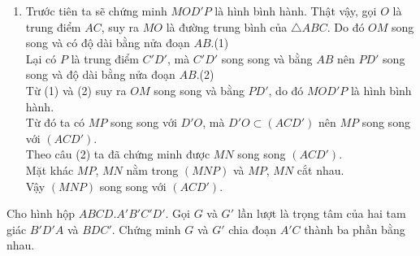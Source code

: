 \begin{bt}
\begin{bt}[CD, mức độ 3]
{\begin{enumerate}
			\item Trước tiên ta sẽ chứng minh $MOD'P$ là hình bình hành.
			Thật vậy, gọi $O$ là trung điểm $AC$, suy ra $MO$ là đường trung bình của $\triangle ABC$. Do đó $OM$ song song và có độ dài bằng nửa đoạn $AB$.\hfill (1)\\
			Lại có $P$ là trung điểm $C'D'$, mà $C'D'$ song song và bằng $AB$ nên $PD'$ song song và độ dài bằng nửa đoạn $AB$.\hfill (2)\\
			Từ (1) và (2) suy ra $OM$ song song và bằng $PD'$, do đó $MOD'P$ là hình bình hành.\\
			Từ đó ta có $MP$ song song với $D'O$, mà $D'O\subset (ACD')$ nên $MP$ song song với $(ACD')$.\\
			Theo câu (2) ta đã chứng minh được $MN$ song song $(ACD')$.\\
			Mặt khác $MP$, $MN$ nằm trong $(MNP)$ và $MP$, $MN$ cắt nhau.\\
			Vậy $(MNP)$ song song với $(ACD')$.
		\end{enumerate}
	}
\end{bt}

\begin{bt}[mức độ 3]%
	Cho hình hộp $ABCD.A'B'C'D'$. Gọi $G$ và $G'$ lần lượt là trọng tâm của hai tam giác $B'D'A$ và $BDC'$. Chứng minh $G$ và $G'$ chia đoạn $A'C$ thành ba phần bằng nhau.
\end{bt}
\end{bt}
